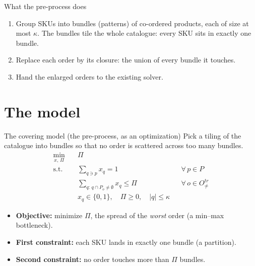 \documentclass[11pt,aspectratio=169]{beamer}
\newcommand{\kk}{\kappa}
\begin{document}
\begin{frame}{What the pre-process does}
  \begin{enumerate}
    \item Group SKUs into \alert{bundles} (patterns) of co-ordered products,
          each of size at most $\kk$. The bundles \alert{tile} the whole
          catalogue: every SKU sits in exactly one bundle.
    \item Replace each order by its \alert{closure}: the union of every bundle
          it touches.
    \item Hand the enlarged orders to the existing solver.
  \end{enumerate}
  \vspace{0.6em}
\end{frame}

\section{The model}
\begin{frame}{The covering model (the pre-process, as an optimization)}
  Pick a tiling of the catalogue into bundles so that no order is scattered
  across too many bundles.
  \begin{align*}
    \min_{x,\,\Pi}\quad & \Pi \\
    \text{s.t.}\quad
      & \sum_{q \ni p} x_q = 1 && \forall\, p \in P \\
      & \sum_{q:\, q \cap P_o \neq \emptyset} x_q \le \Pi && \forall\, o \in O^{tr}_{\neq} \\
      & x_q \in \{0,1\}, \quad \Pi \ge 0, \quad |q|\le \kk
  \end{align*}
  \begin{itemize}\small
    \item \textbf{Objective:} minimize $\Pi$, the spread of the \emph{worst} order
          (a min--max bottleneck).
    \item \textbf{First constraint:} each SKU lands in exactly one bundle (a partition).
    \item \textbf{Second constraint:} no order touches more than $\Pi$ bundles.
  \end{itemize}
\end{frame}
\end{document}

